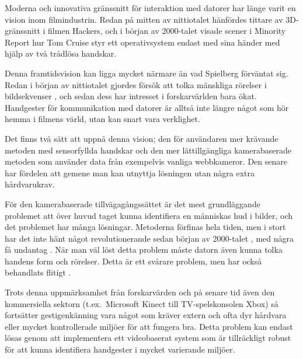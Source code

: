 \documentclass[../rapport_MVEX01-11-05]{subfiles}
\begin{document}
Moderna och innovativa gränssnitt för interaktion med datorer har länge varit
en vision inom filmindustrin. Redan på mitten av nittiotalet hänfördes
tittare av 3D-gränssnitt i filmen Hackers, och i början av 2000-talet visade
scener i Minority Report hur Tom Cruise styr ett operativsystem endast med
sina händer med hjälp av två trådlösa handskar.

Denna framtidsvision kan
ligga mycket närmare än vad Spielberg förväntat sig. Redan i början av
nittiotalet gjordes försök att tolka mänskliga rörelser i bildsekvenser
\cite{Yamato92}, och sedan dess har intresset i forskarvärlden bara ökat.
Handgester för kommunikation med datorer är alltså inte längre något som
hör hemma i filmens värld, utan kan snart vara verklighet.

Det finns två sätt att uppnå denna vision; den för användaren mer krävande
metoden med sensorfyllda handskar och den mer lättillgängliga kamerabaserade
metoden som använder data från exempelvis vanliga webbkameror. Den senare har
fördelen att gemene man kan utnyttja lösningen utan några extra hårdvarukrav.

För den kamerabaserade tillvägagångssättet är det mest grundläggande problemet
att över huvud taget kunna identifiera en människas hud i bilder, och det
problemet har många lösningar. Metoderna förfinas hela tiden, men i stort har
det inte hänt något revolutionerande sedan början av 2000-talet
\cite{Sebe04,Kruppa02,Albiol01,Brand00}, med några få undantag
. När man väl löst detta problem måste datorn
även kunna tolka handens form och rörelser. Detta är ett svårare problem, men
har också behandlats flitigt \cite{Pavlovic97,Garg09,Nielsen04,Zabulis09}.

%

Trots denna uppmärksamhet från forskarvärden och på senare tid även den kommersiella sektorn
 (t.ex.~Microsoft Kinect till TV-spelskonsolen Xbox) så fortsätter
gestigenkänning vara något som
kräver extern och ofta dyr hårdvara eller mycket kontrollerade miljöer för att
fungera bra. Detta problem kan endast lösas genom att implementera ett
videobaserat system som är tillräckligt robust för att kunna identifiera
handgester i mycket varierande miljöer.
\end{document}
